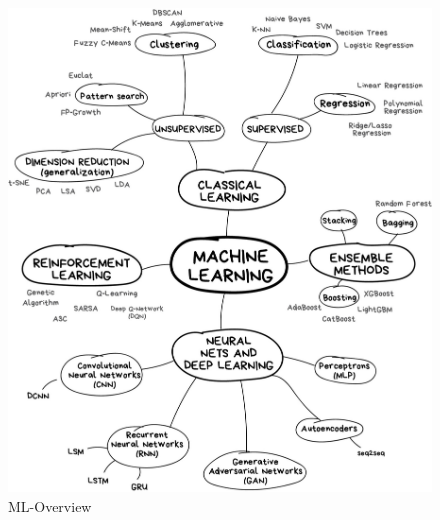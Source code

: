 \begin{figure}[hbtp]
	\centering
	\includegraphics[width=1\textwidth]{ML}
	\caption{ML-Overview}
	\label{fig:Datensatz - unbearbeitet}
\end{figure}


\newpage